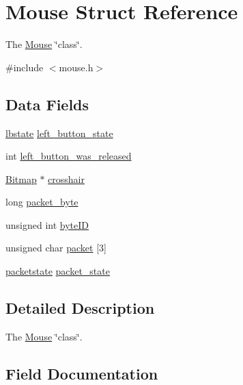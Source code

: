 \hypertarget{struct_mouse}{}\section{Mouse Struct Reference}
\label{struct_mouse}


The \hyperlink{struct_mouse}{Mouse} \char`\"{}class\char`\"{}.  




{\ttfamily \#include $<$mouse.\+h$>$}

\subsection*{Data Fields}
\begin{DoxyCompactItemize}
\item 
\hyperlink{group__mouse_gaab5a16f4c5c371d5048e7a729a8b45c7}{lbstate} \hyperlink{struct_mouse_a3460dc9908f5759debb0d94ccd939eb0}{left\+\_\+button\+\_\+state}
\item 
int \hyperlink{struct_mouse_a0fc78a583cf4573ff7df06591ac3b4ef}{left\+\_\+button\+\_\+was\+\_\+released}
\item 
\hyperlink{struct_bitmap}{Bitmap} $\ast$ \hyperlink{struct_mouse_a6d9b94480453acd797d61e51453ff026}{crosshair}
\item 
long \hyperlink{struct_mouse_a005ddb9e0f69d5f8ff8ba9811006637f}{packet\+\_\+byte}
\item 
unsigned int \hyperlink{struct_mouse_a593aab8c835cac0b2110f8d4e3f4124e}{byte\+ID}
\item 
unsigned char \hyperlink{struct_mouse_a1d1878244696a8be772aa71772c33f0a}{packet} \mbox{[}3\mbox{]}
\item 
\hyperlink{group__mouse_ga15fce23ec12347df2f9ef8c3366eb01d}{packetstate} \hyperlink{struct_mouse_a600d48813331aacf281603f33b7ce452}{packet\+\_\+state}
\end{DoxyCompactItemize}


\subsection{Detailed Description}
The \hyperlink{struct_mouse}{Mouse} \char`\"{}class\char`\"{}. 

\subsection{Field Documentation}
\hypertarget{struct_mouse_a593aab8c835cac0b2110f8d4e3f4124e}{}\label{struct_mouse_a593aab8c835cac0b2110f8d4e3f4124e} 
